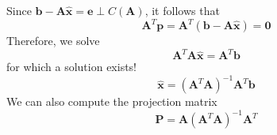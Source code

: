 \documentclass[aspectratio=169]{beamer}
\newcommand{\A}{\mathbf{A}}
\newcommand{\Pro}{\mathbf{P}}
\newcommand{\xx}{\mathbf{x}}
\newcommand{\bb}{\mathbf{b}}
\newcommand{\ee}{\mathbf{e}}
\newcommand{\pp}{\mathbf{p}}
\begin{document}
	\begin{frame}
	Since $\bb - \A \hat{\xx} = \ee \perp C(\A)$, it follows that
	\begin{equation}
		\A^T \pp = 	\A^T (\bb - \A \hat{\xx}) = \mathbf{0}
	\end{equation}
	Therefore, we solve 
	\begin{equation}
		\A^T\A \hat{\xx} = \A^T \bb
	\end{equation}
	for which a solution exists!
		\begin{equation}
	\hat{\xx} = (\A^T\A)^{-1}\A^T \bb
	\end{equation}
	We can also compute the projection matrix
	\begin{equation}
		\Pro = \A(\A^T\A)^{-1}\A^T
	\end{equation}
	\end{frame}
\end{document}
